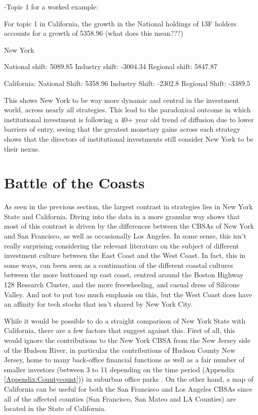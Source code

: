 -Topic 1 for a worked example:  

For topic 1 in California, the growth in the National holdings of 13F holders accounts for a growth of 5358.96 (what does this mean???)  

New York 

National shift:  5089.85
Industry shift: -3004.34
Regional shift:  5847.87

California:  
National Shift:  5358.96
Industry Shift: -2302.8
Regional Shift: -3389.5

This shows New York to be way more dynamic and central in the investment world, across nearly all strategies. This lead to the paradoxical outcome in which institutional investment is following a 40+ year old trend of diffusion due to lower barriers of entry, seeing that the greatest monetary gains across each strategy shows that the directors of institutional investments still consider New York to be their nexus.  






\section{Battle of the Coasts}
\label{BattleoftheCoasts}
As seen in the previous section, the largest contrast in strategies lies in New York State and California.  Diving into the data in a more granular way shows that most of this contrast is driven by the differences between the CBSAs of New York and San Francisco, as well as occasionally Los Angeles.  In some sense, this isn't really surprising considering the relevant literature  on the subject of different investment culture between the East Coast and the West Coast.  In fact, this in some ways, can been seen as a continuation of the different coastal cultures between the more buttoned up east coast, centred around the Boston Highway 128 Research Cluster, and the more freewheeling, and casual dress of Silicone Valley.  And not to put too much emphasis on this, but the West Coast does have an affinity for tech stocks that isn't shared by New York City.  

While it would be possible to do a straight comparison of New York State with California, there are a few factors that suggest against this.  First of all, this would ignore the contributions to the New York CBSA from the New Jersey side of the Hudson River, in particular the contributions of Hudson County New Jersey, home to many back-office financial functions as well as a fair number of smaller investors (between 3 to 11 depending on the time period (Appendix \ref{Appendix:Countycount})) in suburban office  parks \citep{gongthe2012}.  On the other hand, a map of California can be useful for both the San Francisco and Los Angeles CBSAs since all of the affected counties (San Francisco, San Mateo and LA Counties) are located in the State of California.  


